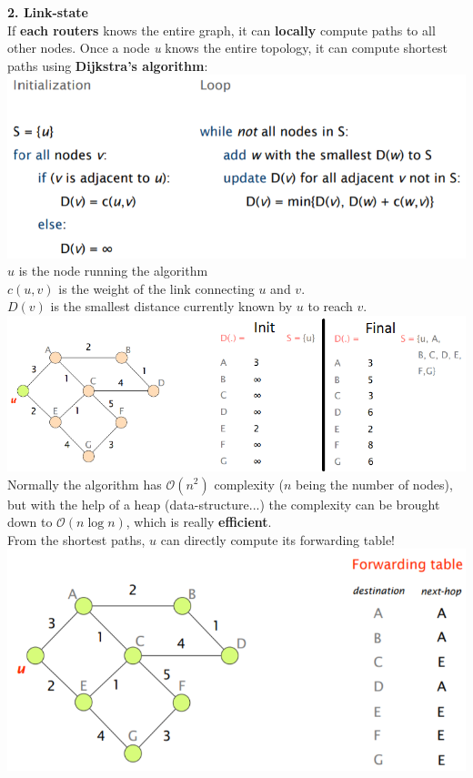 \documentclass[a4paper, fontsize=8pt, landscape, DIV=1]{scrartcl}
\begin{document}
\begin{multicols*}{4}
			\textbf{2. Link-state}\\
			If \textbf{each routers} knows the entire graph, it can \textbf{locally} compute paths to all other nodes. Once a node \textit{u} knows the entire topology, it can compute shortest paths using \textbf{Dijkstra's algorithm}:
			\includegraphics[width=\columnwidth]{images/Concepts/Dijkstra.png}
			$u$ is the node running the algorithm\\
			$c(u,v)$ is the weight of the link connecting $u$ and $v$. \\
			$D(v)$ is the smallest distance currently known by $u$ to reach $v$.\\
			\includegraphics[width=\columnwidth]{images/Concepts/Dijkstra_example.png} 
			Normally the algorithm has $\mathcal{O}(n^2)$ complexity ($n$ being the number of nodes), but with the help of a heap (data-structure...) the complexity can be brought down to $\mathcal{O}(n\log n)$, which is really \textbf{efficient}.\\
			From the shortest paths, $u$ can directly compute its forwarding table! 
		    \includegraphics[width=\columnwidth]{images/Concepts/forwarding_table.png} 	 

\end{multicols*}
\end{document}
